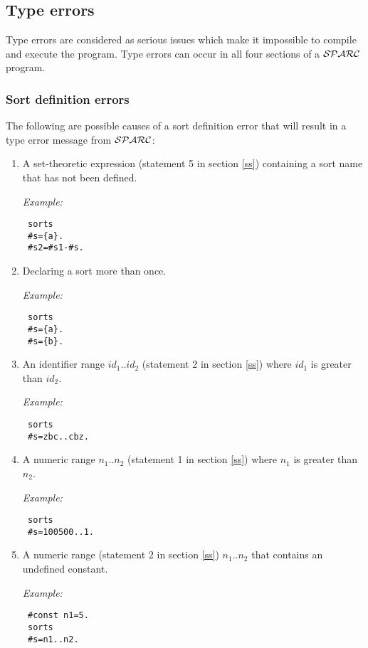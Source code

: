 \documentclass[12pt, letterpaper]{article}
\begin{document}
\subsection{Type errors}
Type errors are considered as serious issues which make it  impossible to compile and execute the program.
Type errors can occur in all four sections of a ${\cal SPARC}$ program.
\subsubsection{Sort definition errors}
The following are possible causes of a sort definition error  that will result in a type error  message from ${\cal SPARC}$:
\begin{enumerate}
\item  A set-theoretic expression (statement 5 in section \ref{ss}) containing a sort name that has not been defined.

\textit{Example:}
\begin{verbatim}
 sorts
 #s={a}.
 #s2=#s1-#s.
\end{verbatim}

\item  Declaring a sort more than once.

\textit{Example:}
\begin{verbatim}
 sorts
 #s={a}.
 #s={b}.
\end{verbatim}

\item An identifier range $id_1..id_2$ (statement 2 in section \ref{ss}) where $id_1$ is greater than $id_2$.

\textit{Example:}
\begin{verbatim}
 sorts
 #s=zbc..cbz.
\end{verbatim}

\item A numeric range $n_1..n_2$ (statement 1 in section \ref{ss}) where  $n_1$ is greater than $n_2$.

\textit{Example:}
\begin{verbatim}
 sorts
 #s=100500..1.
\end{verbatim}


\item A numeric range (statement 2 in section \ref{ss}) $n_1..n_2$ that  contains an undefined constant.

\textit{Example:}
\begin{verbatim}
 #const n1=5.
 sorts
 #s=n1..n2.
\end{verbatim}


\end{enumerate}
\end{document}
